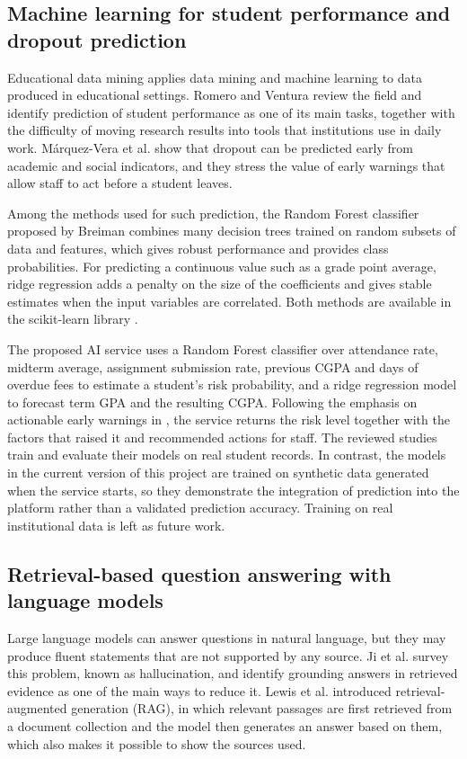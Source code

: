 \subsection{Machine learning for student performance and dropout prediction}
Educational data mining applies data mining and machine learning to data produced in educational settings. Romero and Ventura \cite{romero2010edm} review the field and identify prediction of student performance as one of its main tasks, together with the difficulty of moving research results into tools that institutions use in daily work. M\'{a}rquez-Vera et al. \cite{marquezvera2016dropout} show that dropout can be predicted early from academic and social indicators, and they stress the value of early warnings that allow staff to act before a student leaves.

Among the methods used for such prediction, the Random Forest classifier proposed by Breiman \cite{breiman2001randomforests} combines many decision trees trained on random subsets of data and features, which gives robust performance and provides class probabilities. For predicting a continuous value such as a grade point average, ridge regression \cite{hoerl1970ridge} adds a penalty on the size of the coefficients and gives stable estimates when the input variables are correlated. Both methods are available in the scikit-learn library \cite{pedregosa2011sklearn}.

The proposed AI service uses a Random Forest classifier over attendance rate, midterm average, assignment submission rate, previous CGPA and days of overdue fees to estimate a student's risk probability, and a ridge regression model to forecast term GPA and the resulting CGPA. Following the emphasis on actionable early warnings in \cite{marquezvera2016dropout}, the service returns the risk level together with the factors that raised it and recommended actions for staff. The reviewed studies train and evaluate their models on real student records. In contrast, the models in the current version of this project are trained on synthetic data generated when the service starts, so they demonstrate the integration of prediction into the platform rather than a validated prediction accuracy. Training on real institutional data is left as future work.

\subsection{Retrieval-based question answering with language models}
Large language models can answer questions in natural language, but they may produce fluent statements that are not supported by any source. Ji et al. \cite{ji2023hallucination} survey this problem, known as hallucination, and identify grounding answers in retrieved evidence as one of the main ways to reduce it. Lewis et al. \cite{lewis2020rag} introduced retrieval-augmented generation (RAG), in which relevant passages are first retrieved from a document collection and the model then generates an answer based on them, which also makes it possible to show the sources used.

